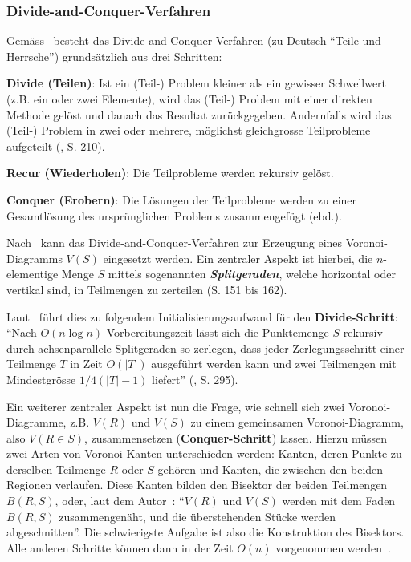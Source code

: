 \subsubsection{Divide-and-Conquer-Verfahren}
\label{ssub:voronoiAlgorithmsDivAndConq}
Gemäss~\citeauthor{goodrich2002algorithm} besteht das Divide-and-Conquer-Verfahren (zu Deutsch ``Teile und Herrsche'') grundsätzlich aus drei Schritten:

\begin{compactitem}
\item \textbf{Divide (Teilen)}: Ist ein (Teil-) Problem kleiner als ein gewisser Schwellwert (z.B. ein oder zwei Elemente), wird das (Teil-) Problem mit einer direkten Methode gelöst und danach das Resultat zurückgegeben. Andernfalls wird das (Teil-) Problem in zwei oder mehrere, möglichst gleichgrosse Teilprobleme aufgeteilt (\citeyear{goodrich2002algorithm}, S. 210).

    \item \textbf{Recur (Wiederholen)}: Die Teilprobleme werden rekursiv gelöst.

    \item \textbf{Conquer (Erobern)}: Die Lösungen der Teilprobleme werden zu einer Gesamtlösung des ursprünglichen Problems zusammengefügt (ebd.).

\end{compactitem}

Nach~\citeauthor{shamos1975closestpoint} kann das Divide-and-Conquer-Verfahren zur Erzeugung eines Voronoi-Diagramms $V(S)$ eingesetzt werden. Ein zentraler Aspekt ist hierbei, die $n$-elementige Menge $S$ mittels sogenannten \textit{\textbf{Splitgeraden}}, welche horizontal oder vertikal sind, in Teilmengen zu zerteilen (S. 151 bis 162).

Laut~\citeauthor{klein2005algorithmischegeometrie} führt dies zu folgendem Initialisierungsaufwand für den \textbf{Divide-Schritt}: ``Nach $O(n \log{n})$ Vorbereitungszeit lässt sich die Punktemenge $S$ rekursiv durch achsenparallele Splitgeraden so zerlegen, dass jeder Zerlegungsschritt einer Teilmenge $T$ in Zeit $O(|T|)$ ausgeführt werden kann und zwei Teilmengen mit Mindestgrösse $1/4(|T| - 1)$ liefert'' (\citeyear{klein2005algorithmischegeometrie}, S. 295).

Ein weiterer zentraler Aspekt ist nun die Frage, wie schnell sich zwei Voronoi-Diagramme, z.B. $V(R)$ und $V(S)$ zu einem gemeinsamen Voronoi-Diagramm, also $V(R \in S)$, zusammensetzen (\textbf{Conquer-Schritt}) lassen. Hierzu müssen zwei Arten von Voronoi-Kanten unterschieden werden: Kanten, deren Punkte zu derselben Teilmenge $R$ oder $S$ gehören und Kanten, die zwischen den beiden Regionen verlaufen. Diese Kanten bilden den Bisektor der beiden Teilmengen $B(R,S)$, oder, laut dem Autor~\citeauthor{klein2005algorithmischegeometrie}: ``$V(R)$ und $V(S)$ werden mit dem Faden $B(R,S)$ zusammengenäht, und die überstehenden Stücke werden abgeschnitten''. Die schwierigste Aufgabe ist also die Konstruktion des Bisektors. Alle anderen Schritte können dann in der Zeit $O(n)$ vorgenommen werden~\parencite[S. 297 bis 298]{klein2005algorithmischegeometrie}.

